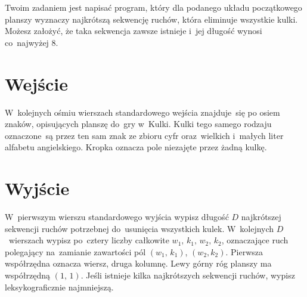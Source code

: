 \documentclass{spiral-kurs}
\begin{document}
	Twoim zadaniem jest napisać program, który dla podanego układu początkowego planszy wyznaczy najkrótszą sekwencję ruchów, która eliminuje wszystkie kulki. Możesz założyć, że taka sekwencja zawsze istnieje i~jej długość wynosi co~najwyżej 8.
	
	\section{Wejście}
	W~kolejnych ośmiu wierszach standardowego wejścia znajduje~się po osiem znaków, opisujących planszę do~gry w~Kulki. Kulki tego samego rodzaju oznaczone~są przez ten sam znak ze zbioru cyfr oraz~wielkich i~małych liter alfabetu angielskiego. Kropka oznacza pole niezajęte przez żadną kulkę.

	\section{Wyjście}
	W~pierwszym wierszu standardowego wyjścia wypisz długość $D$ najkrótszej sekwencji ruchów potrzebnej do~usunięcia wszystkich kulek. W~kolejnych $D$~wierszach wypisz po~cztery liczby całkowite $w_1, \, k_1, \, w_2, \, k_2$, oznaczające ruch polegający na~zamianie zawartości pól $(w_1, \, k_1)$, $(w_2, k_2)$. Pierwsza współrzędna oznacza wiersz, druga kolumnę. Lewy górny róg planszy ma współrzędną $(1, \, 1)$.
	Jeśli istnieje kilka najkrótszych sekwencji ruchów, wypisz leksykograficznie najmniejszą.

	\vspace{-4pt}
\end{document}
